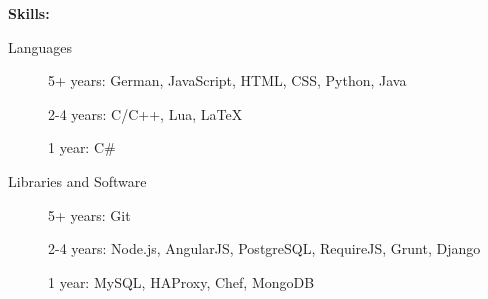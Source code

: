 \documentclass[11pt]{article}
\begin{document}
\bigskip
{\Large \textbf{Skills:}}
\hrulefill
\smallskip
\begin{description}
\item[Languages]
\hfill

5+ years: German, JavaScript, HTML, CSS, Python, Java

2-4 years: C/C++, Lua, LaTeX

1 year: C\#
\item[Libraries and Software]
\hfill

5+ years: Git

2-4 years: Node.js, AngularJS, PostgreSQL, RequireJS, Grunt, Django

1 year: MySQL, HAProxy, Chef, MongoDB
\end{description}
\end{document}
